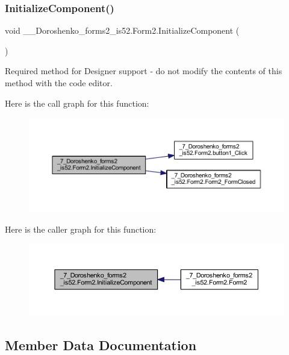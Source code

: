 \subsubsection{\texorpdfstring{Initialize\+Component()}{InitializeComponent()}}
{\footnotesize\ttfamily void \+\_\+\_\+\+Doroshenko\+\_\+forms2\+\_\+is52.\+Form2.\+Initialize\+Component (\begin{DoxyParamCaption}{ }\end{DoxyParamCaption})\hspace{0.3cm}{\ttfamily [private]}}



Required method for Designer support -\/ do not modify the contents of this method with the code editor. 

Here is the call graph for this function\+:
\nopagebreak
\begin{figure}[H]
\begin{center}
\leavevmode
\includegraphics[width=350pt]{class__7___doroshenko__forms2__is52_1_1_form2_af5ba83f8108664f707d7e82f0481f13a_cgraph}
\end{center}
\end{figure}
Here is the caller graph for this function\+:
\nopagebreak
\begin{figure}[H]
\begin{center}
\leavevmode
\includegraphics[width=350pt]{class__7___doroshenko__forms2__is52_1_1_form2_af5ba83f8108664f707d7e82f0481f13a_icgraph}
\end{center}
\end{figure}


\subsection{Member Data Documentation}
\hypertarget{class__7___doroshenko__forms2__is52_1_1_form2_ab9e7d979f5c04ec08cdb7bf458a49404}{}\label{class__7___doroshenko__forms2__is52_1_1_form2_ab9e7d979f5c04ec08cdb7bf458a49404} 
